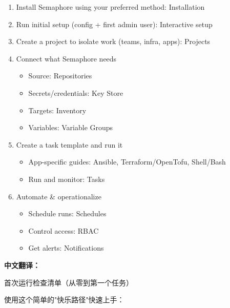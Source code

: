 \documentclass[12pt,UTF8]{ctexbook}
\begin{document}
\begin{enumerate}[leftmargin=3.5em]
    \item Install Semaphore using your preferred method: Installation 
    \item Run initial setup (config + first admin user): Interactive setup 
    \item Create a project to isolate work (teams, infra, apps): Projects 
    \item Connect what Semaphore needs 
    \begin{itemize}[leftmargin=2em]
        \item Source: Repositories 
        \item Secrets/credentials: Key Store 
        \item Targets: Inventory 
        \item Variables: Variable Groups 
    \end{itemize}
    \item Create a task template and run it 
    \begin{itemize}[leftmargin=2em]
        \item App-specific guides: Ansible, Terraform/OpenTofu, Shell/Bash 
        \item Run and monitor: Tasks 
    \end{itemize}
    \item Automate \& operationalize 
    \begin{itemize}[leftmargin=2em]
        \item Schedule runs: Schedules 
        \item Control access: RBAC 
        \item Get alerts: Notifications
    \end{itemize}
\end{enumerate}

\textbf{中文翻译：}

首次运行检查清单（从零到第一个任务）

使用这个简单的"快乐路径"快速上手：
\end{document}
